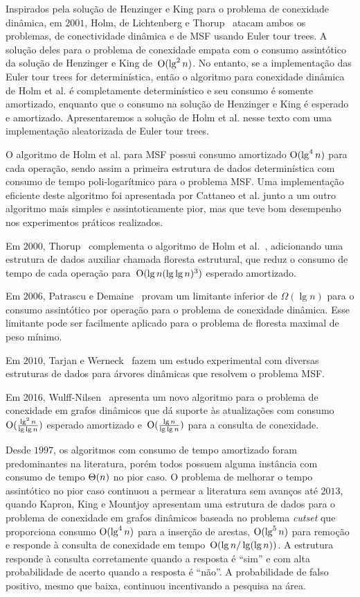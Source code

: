 Inspirados pela solução de Henzinger e King para o problema de conexidade dinâmica, em $2001$, Holm, de Lichtenberg e Thorup~\cite{poly_log} atacam ambos os problemas, de conectividade dinâmica e de MSF usando Euler tour trees.
A solução deles para o problema de conexidade empata com o consumo assintótico da solução de Henzinger e King de~$\mathrm{O}(\lg^2 n)$.
No entanto, se a implementação das Euler tour trees for determinística, então o algoritmo para conexidade dinâmica de Holm et al. é completamente determinístico e seu consumo é somente amortizado,
enquanto que o consumo na solução de Henzinger e King é esperado e amortizado. 
Apresentaremos a solução de Holm et al. nesse texto com uma implementação aleatorizada de Euler tour trees.

O algoritmo de Holm et al. para MSF possui consumo amortizado $\mathrm{O}(\lg^4 n)$ para cada operação, sendo assim a primeira estrutura de dados determinística com consumo de tempo poli-logarítmico para o problema MSF. Uma implementação eficiente deste algoritmo foi apresentada por Cattaneo et al. \cite{xpstudy2002} junto a um outro algoritmo mais simples e assintoticamente pior, mas que teve bom desempenho nos experimentos práticos realizados.

Em $2000$, Thorup~\cite{Thorup2000} complementa o algoritmo de Holm et al.~\cite{poly_log}, adicionando uma estrutura de dados auxiliar chamada floresta estrutural, que reduz o consumo de tempo de cada operação para~$\mathrm{O}(\lg n(\lg\lg n)^3)$ esperado amortizado.

Em $2006$, Patrascu e Demaine~\cite{lowerBoundPatrascu} provam um limitante inferior de $\Omega(\lg n)$ para o consumo assintótico por operação para o problema de conexidade dinâmica.
Esse limitante pode ser facilmente aplicado para o problema de floresta maximal de peso mínimo.

Em $2010$, Tarjan e Werneck~\cite{tarjanWerneck2010} fazem um estudo experimental com diversas estruturas de dados para árvores dinâmicas que resolvem o problema MSF.

Em 2016, Wulff-Nilsen~\cite{Wulff-Nilsen2016} apresenta um novo algoritmo para o problema de conexidade em grafos dinâmicos que dá suporte às atualizações com consumo~$\mathrm{O}(\frac{\lg^2 n}{\lg \lg n})$ esperado amortizado e~$\mathrm{O}(\frac{\lg n}{\lg \lg n})$ para a consulta de conexidade.

Desde $1997$, os algoritmos com consumo de tempo amortizado foram predominantes na literatura, porém todos possuem alguma instância com consumo de tempo $\Theta(n)$ no pior caso.
O problema de melhorar o tempo assintótico no pior caso continuou a permear a literatura sem avanços até $2013$, quando Kapron, King e Mountjoy \cite{bruceM} apresentam uma estrutura de dados para o problema de conexidade em grafos dinâmicos baseada no problema \textit{cutset} que proporciona consumo $\mathrm{O}(\lg^4 n)$ para a inserção de arestas, $\mathrm{O}(\lg^5 n)$ para remoção e responde à consulta de conexidade em tempo~$\mathrm{O}(\lg n / \lg(\lg n))$.
A estrutura responde à consulta corretamente quando a resposta é “sim” e com alta probabilidade de acerto quando a resposta é “não”. A probabilidade de falso positivo, mesmo que baixa, continuou incentivando a pesquisa na área. 

